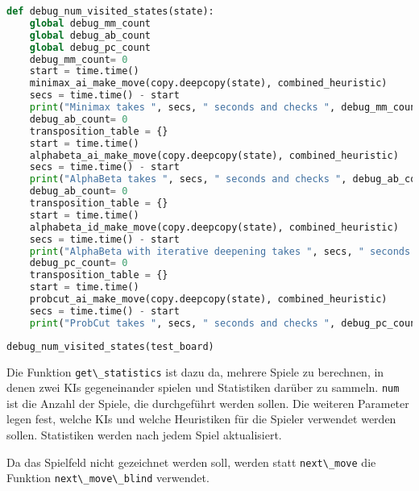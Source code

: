 \begin{lstlisting}[language=Python]
def debug_num_visited_states(state):
    global debug_mm_count
    global debug_ab_count
    global debug_pc_count
    debug_mm_count= 0
    start = time.time()
    minimax_ai_make_move(copy.deepcopy(state), combined_heuristic)
    secs = time.time() - start
    print("Minimax takes ", secs, " seconds and checks ", debug_mm_count, "substates")
    debug_ab_count= 0
    transposition_table = {}
    start = time.time()
    alphabeta_ai_make_move(copy.deepcopy(state), combined_heuristic)
    secs = time.time() - start
    print("AlphaBeta takes ", secs, " seconds and checks ", debug_ab_count, "substates")
    debug_ab_count= 0
    transposition_table = {}
    start = time.time()
    alphabeta_id_make_move(copy.deepcopy(state), combined_heuristic)
    secs = time.time() - start
    print("AlphaBeta with iterative deepening takes ", secs, " seconds and checks ", debug_ab_count, "substates")
    debug_pc_count= 0
    transposition_table = {}
    start = time.time()
    probcut_ai_make_move(copy.deepcopy(state), combined_heuristic)
    secs = time.time() - start
    print("ProbCut takes ", secs, " seconds and checks ", debug_pc_count, "substates")
\end{lstlisting}

\begin{lstlisting}[language=Python]
debug_num_visited_states(test_board)
\end{lstlisting}

Die Funktion \passthrough{\lstinline!get\_statistics!} ist dazu da,
mehrere Spiele zu berechnen, in denen zwei KIs gegeneinander spielen und
Statistiken darüber zu sammeln. \passthrough{\lstinline!num!} ist die
Anzahl der Spiele, die durchgeführt werden sollen. Die weiteren
Parameter legen fest, welche KIs und welche Heuristiken für die Spieler
verwendet werden sollen. Statistiken werden nach jedem Spiel
aktualisiert.

Da das Spielfeld nicht gezeichnet werden soll, werden statt
\passthrough{\lstinline!next\_move!} die Funktion
\passthrough{\lstinline!next\_move\_blind!} verwendet.

